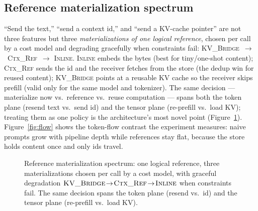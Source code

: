 \documentclass[11pt]{article}
\begin{document}
\subsection{Reference materialization spectrum}\label{sec:refspec}
``Send the text,'' ``send a context id,'' and ``send a KV-cache pointer'' are not three features but
three \emph{materializations of one logical reference}, chosen per call by a cost model and degrading
gracefully when constraints fail: \textsc{KV\_Bridge}~$\rightarrow$~\textsc{Ctx\_Ref}~$\rightarrow$
\textsc{Inline}. \textsc{Inline} embeds the bytes (best for tiny/one-shot content); \textsc{Ctx\_Ref}
sends the id and the receiver fetches from the store (the dedup win for reused content); \textsc{KV\_Bridge}
points at a reusable KV cache so the receiver skips prefill (valid only for the same model and
tokenizer). The same decision --- materialize now vs.\ reference vs.\ reuse computation --- spans both
the token plane (resend text vs.\ send id) and the tensor plane (re-prefill vs.\ load KV); treating
them as one policy is the architecture's most novel point (Figure~\ref{fig:spectrum}).
Figure~\ref{fig:flow} shows the token-flow contrast the experiment measures: naive prompts grow with
pipeline depth while references stay flat, because the store holds content once and only ids travel.

\begin{figure}[h]\centering
{}
\caption{Reference materialization spectrum: one logical reference, three materializations chosen per
call by a cost model, with graceful degradation
$\textsc{KV\_Bridge}\!\rightarrow\!\textsc{Ctx\_Ref}\!\rightarrow\!\textsc{Inline}$ when constraints
fail. The same decision spans the token plane (resend vs.\ id) and the tensor plane (re-prefill vs.\
load KV).}
\label{fig:spectrum}
\end{figure}
\end{document}
